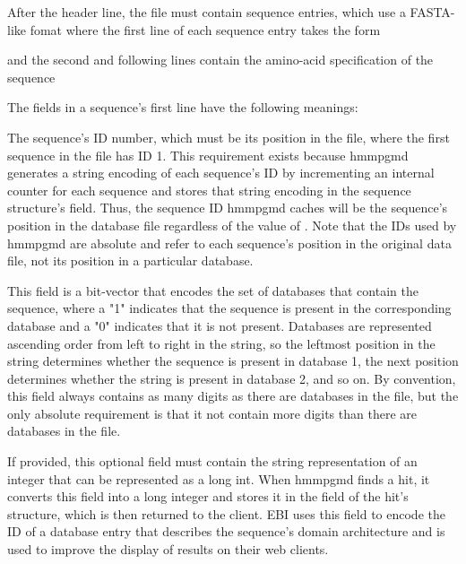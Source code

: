 \documentclass[notoc,justified]{tufte-book}    %
\begin{document}
After the header line, the file must contain  sequence entries, which use a FASTA-like fomat where the first line of each sequence entry takes the form 


and the second and following lines contain the amino-acid specification of the sequence  

The fields in a sequence's first line have the following meanings:

\begin{sreitems}{}

\item [\monob{seq\_id}] The sequence's ID number, which must be its position in the file, where the first sequence in the file has ID 1. This requirement exists because hmmpgmd generates a string encoding of each sequence's ID by incrementing an internal counter for each sequence and stores that string encoding in the sequence structure's  field.  Thus, the sequence ID hmmpgmd caches will be the sequence's position in the database file regardless of the value of .  Note that the IDs used by hmmpgmd are absolute and refer to each sequence's position in the original data file, not its position in a particular database.

\item [\monob{database\_membership}] This field is a bit-vector that encodes the set of databases that contain the sequence, where a "1" indicates that the sequence is present in the corresponding database and a "0" indicates that it is not present.  Databases are represented ascending order from left to right in the string, so the leftmost position in the string determines whether the sequence is present in database 1, the next position determines whether the string is present in database 2, and so on.  By convention, this field always contains as many digits as there are databases in the file, but the only absolute requirement is that it not contain more digits than there are databases in the file.

\item [\monob{domain\_architecture}] If provided, this optional field must contain the string representation of an integer that can be represented as a long int.  When hmmpgmd finds a hit, it converts this field into a long integer and stores it in the  field of the hit's  structure, which is then returned to the client.  EBI uses this field to encode the ID of a database entry that describes the sequence's domain architecture and is used to improve the display of results on their web clients.   


\end{sreitems}
\end{document}
